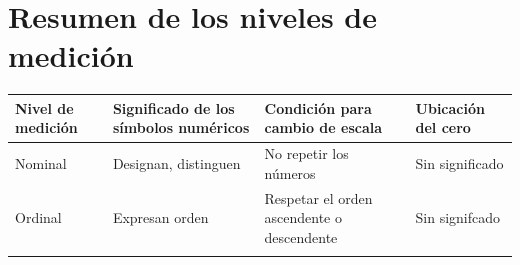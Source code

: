 \documentclass[]{book}
\begin{document}
\hypertarget{resumen-de-los-niveles-de-mediciuxf3n}{%
\section{Resumen de los niveles de medición}\label{resumen-de-los-niveles-de-mediciuxf3n}}

\begin{longtable}[]{@{}llll@{}}
\toprule
\begin{minipage}[b]{0.14\columnwidth}\raggedright
Nivel de medición\strut
\end{minipage} & \begin{minipage}[b]{0.29\columnwidth}\raggedright
Significado de los símbolos numéricos\strut
\end{minipage} & \begin{minipage}[b]{0.32\columnwidth}\raggedright
Condición para cambio de escala\strut
\end{minipage} & \begin{minipage}[b]{0.14\columnwidth}\raggedright
Ubicación del cero\strut
\end{minipage}\tabularnewline
\midrule
\endhead
\begin{minipage}[t]{0.14\columnwidth}\raggedright
Nominal\strut
\end{minipage} & \begin{minipage}[t]{0.29\columnwidth}\raggedright
Designan, distinguen\strut
\end{minipage} & \begin{minipage}[t]{0.32\columnwidth}\raggedright
No repetir los números\strut
\end{minipage} & \begin{minipage}[t]{0.14\columnwidth}\raggedright
Sin significado\strut
\end{minipage}\tabularnewline
\begin{minipage}[t]{0.14\columnwidth}\raggedright
Ordinal\strut
\end{minipage} & \begin{minipage}[t]{0.29\columnwidth}\raggedright
Expresan orden\strut
\end{minipage} & \begin{minipage}[t]{0.32\columnwidth}\raggedright
Respetar el orden ascendente o descendente\strut
\end{minipage} & \begin{minipage}[t]{0.14\columnwidth}\raggedright
Sin signifcado\strut
\end{minipage}\tabularnewline
\begin{minipage}[t]{0.14\columnwidth}\raggedright

\end{minipage}
\end{longtable}
\end{document}
